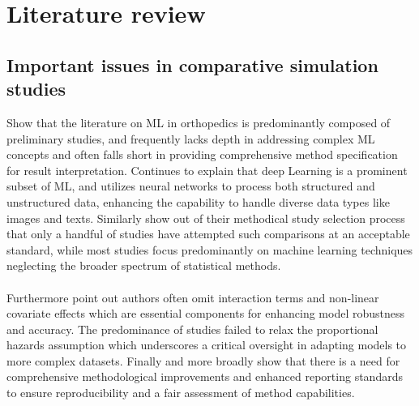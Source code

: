 \chapter{Literature review}
\section{Important issues in comparative simulation studies}

\noindent \parencite{polce_guide_2023} Show that the literature on ML in orthopedics is predominantly composed of preliminary studies, and frequently lacks depth in addressing complex ML concepts and often falls short in providing comprehensive method specification for result interpretation. \parencite{polce_guide_2023} Continues to explain that deep Learning is a prominent subset of ML, and utilizes neural networks to process both structured and unstructured data, enhancing the capability to handle diverse data types like images and texts. Similarly \parencite{smith_scoping_2022} show out of their methodical study selection process that only a handful of studies have attempted such comparisons at an acceptable standard, while most studies focus predominantly on machine learning techniques neglecting the broader spectrum of statistical methods. 
\\\\
Furthermore \parencite{smith_scoping_2022} point out authors often omit interaction terms and non-linear covariate effects which are essential components for enhancing model robustness and accuracy. The predominance of studies failed to relax the proportional hazards assumption which underscores a critical oversight in adapting models to more complex datasets. Finally and more broadly \parencite{smith_scoping_2022} show that there is a need for comprehensive methodological improvements and enhanced reporting standards to ensure reproducibility and a fair assessment of method capabilities.
\\\\
